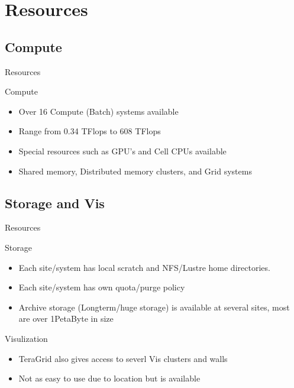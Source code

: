 \documentclass[handout]{beamer}
\begin{document}
  \section{Resources}
  
  \subsection{Compute}
  \begin{frame}{Resources}
   \begin{block}{Compute}
    \begin{itemize}
      \item Over 16 Compute (Batch) systems available
      \item Range from 0.34 TFlops to 608 TFlops
      \item Special resources such as GPU's and Cell CPUs available
      \item Shared memory, Distributed memory clusters, and Grid systems
    \end{itemize}
   \end{block}
  \end{frame}

  \subsection{Storage and Vis}
  \begin{frame}{Resources}
   \begin{block}{Storage}
     \begin{itemize}
      \item Each site/system has local scratch and NFS/Lustre home directories.
      \item Each site/system has own quota/purge policy
      \item Archive storage (Longterm/huge storage) is available at several sites, most are over 1PetaByte in size
     \end{itemize}
   \end{block}
   \begin{block}{Visulization}
   \begin{itemize}
    \item TeraGrid also gives access to severl Vis clusters and walls
    \item Not as easy to use due to location but is available
   \end{itemize}
   \end{block}
  \end{frame}
\end{document}
